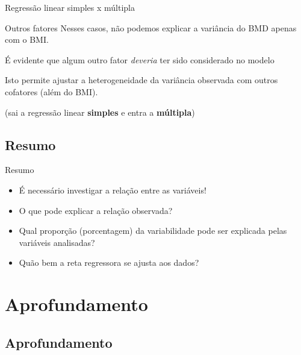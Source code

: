 \documentclass{beamer}
\begin{document}
\begin{frame}{\small Regressão linear simples x múltipla}
  \begin{block}{Outros fatores}
    Nesses casos, não podemos explicar a variância do BMD apenas com o BMI.

    \bigskip
    \small
    É evidente que algum outro fator {\it deveria} ter sido considerado no modelo

    \bigskip
    Isto permite \alert{ajustar} a heterogeneidade da variância observada com outros cofatores (além do BMI).
  \end{block}
  \vfill
  \hfill \footnotesize (sai a regressão linear {\bf simples} e entra a {\bf múltipla})
\end{frame}

\subsection{Resumo}

\begin{frame}{Resumo}
  \begin{itemize}
  \item É necessário investigar a relação entre as variáveis!
  \item O que pode explicar a relação observada?
  \item Qual proporção (porcentagem) da variabilidade pode ser
    explicada pelas variáveis analisadas?
  \item Quão bem a reta regressora se ajusta aos dados?
  \end{itemize}
\end{frame}

\section{Aprofundamento}

\subsection{Aprofundamento}
\end{document}
